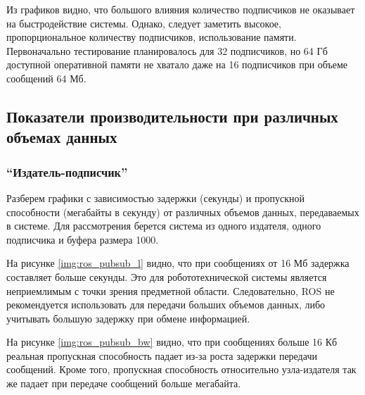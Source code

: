 Из графиков видно, что большого влияния количество подписчиков не оказывает на быстродействие системы. Однако, следует заметить высокое, пропорциональное количеству подписчиков, использование памяти. Первоначально тестирование планировалось для 32 подписчиков, но 64 Гб доступной оперативной памяти не хватало даже на 16 подписчиков при объеме сообщений 64 Мб. 


\subsection{Показатели производительности при различных объемах данных}
\subsubsection{\enquote{Издатель-подписчик}}
Разберем графики с зависимостью задержки (секунды) и пропускной способности (мегабайты в секунду) от различных объемов данных, передаваемых в системе. Для рассмотрения берется система из одного издателя, одного подписчика и буфера размера 1000.


На рисунке \ref{img:ros_pubsub_l} видно, что при сообщениях от 16 Мб задержка составляет больше секунды. Это для робототехнической системы является неприемлимым с точки зрения предметной области. Следовательно, ROS не рекомендуется использовать для передачи больших объемов данных, либо учитывать большую задержку при обмене информацией.

На рисунке \ref{img:ros_pubsub_bw} видно, что при сообщениях больше 16 Кб реальная пропускная способность падает из-за роста задержки передачи сообщений. Кроме того, пропускная способность относительно узла-издателя так же падает при передаче сообщений больше мегабайта.

